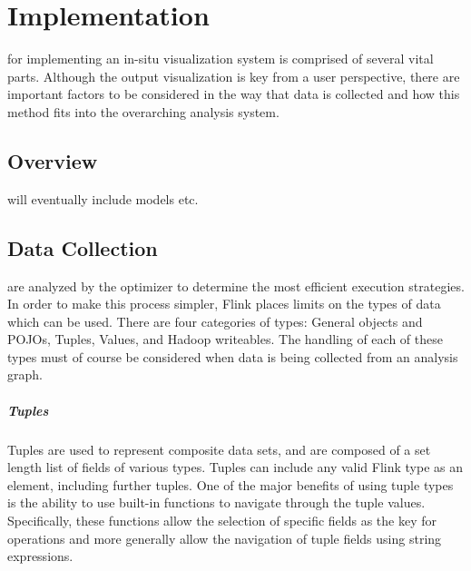 \chapter{Implementation}
\label{sec:implementation}
 for implementing an in-situ visualization system is comprised of several vital parts. Although the  output visualization is key from a user perspective, there are important factors to be considered in the way that data is collected and how this method fits into the overarching analysis system. 
 
\section{Overview}
\label{sec:overview}
 will eventually include models etc.

\section{Data Collection}
\label{sec:data_collection}
 are analyzed by the optimizer to determine the most efficient execution strategies. In order to make this process simpler, Flink places limits on the types of data which can be used. There are four categories of types: General objects and POJOs, Tuples, Values, and Hadoop writeables. The handling of each of these types must of course be considered when data is being collected from an analysis graph.

\paragraph{Tuples}
Tuples are used to represent composite data sets, and are composed of a set length list of fields of various types. Tuples can include any valid Flink type as an element, including further tuples. One of the major benefits of using tuple types is the ability to use built-in functions to navigate through the tuple values. Specifically, these functions allow the selection of specific fields as the key for operations and more generally allow the navigation of tuple fields using string expressions.

